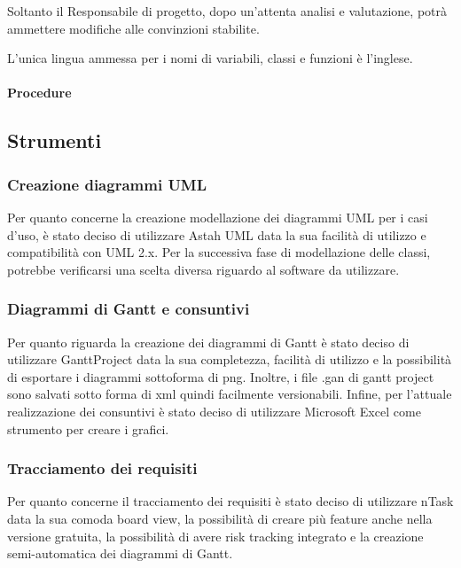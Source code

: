 Soltanto il Responsabile di progetto, dopo un'attenta analisi e valutazione, potrà ammettere modifiche alle convinzioni stabilite.

L’unica lingua ammessa per i nomi di variabili, classi e funzioni è l’inglese.
\paragraph{Procedure}
\subsection{Strumenti}
\subsubsection{Creazione diagrammi UML}
Per quanto concerne la creazione modellazione dei diagrammi UML per i casi d'uso, è stato deciso di utilizzare Astah UML data la sua facilità di utilizzo e compatibilità con UML 2.x. Per la successiva fase di modellazione delle classi, potrebbe verificarsi una scelta diversa riguardo al software da utilizzare.
\subsubsection{Diagrammi di Gantt e consuntivi}
Per quanto riguarda la creazione dei diagrammi di Gantt è stato deciso di utilizzare GanttProject data la sua completezza, facilità di utilizzo e la possibilità di esportare i diagrammi sottoforma di png. Inoltre, i file .gan di gantt project sono salvati sotto forma di xml quindi facilmente versionabili.
Infine, per l'attuale realizzazione dei consuntivi è stato deciso di utilizzare Microsoft Excel come strumento per creare i grafici.
\subsubsection{Tracciamento dei requisiti}
Per quanto concerne il tracciamento dei requisiti è stato deciso di utilizzare nTask data la sua comoda board view, la possibilità di creare più feature anche nella versione gratuita, la possibilità di avere risk tracking integrato e la creazione semi-automatica dei diagrammi di Gantt.
\pagebreak
